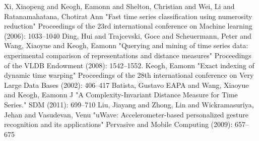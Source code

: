 \begin{thebibliography}{1}
     Xi, Xiaopeng and Keogh, Eamonn and Shelton, Christian and Wei, Li and Ratanamahatana, Chotirat
    Ann "Fast time series classification using numerosity reduction" Proceedings of the 23rd international conference on
    Machine learning (2006): 1033--1040
     Ding, Hui and Trajcevski, Goce and Scheuermann, Peter and Wang, Xiaoyue and Keogh, Eamonn
    "Querying and mining of time series data: experimental comparison of representations and distance measures"
    Proceedings of the VLDB Endowment (2008): 1542--1552.
     Keogh, Eamonn "Exact indexing of dynamic time warping" Proceedings of the 28th
    international conference on Very Large Data Bases (2002): 406--417
     Batista, Gustavo EAPA and Wang, Xiaoyue and Keogh, Eamonn J "A
    Complexity-Invariant Distance Measure for Time Series." SDM (2011): 699--710
     Liu, Jiayang and Zhong, Lin and Wickramasuriya, Jehan and Vasudevan, Venu "uWave:
    Accelerometer-based personalized gesture recognition and its applications" Pervasive and Mobile Computing
    (2009): 657--675
\end{thebibliography}
